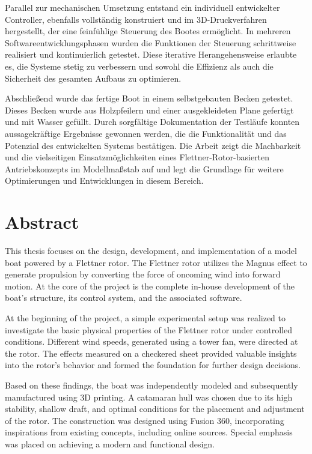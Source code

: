 \documentclass[a4paper,12pt]{article}
\begin{document}
Parallel zur mechanischen Umsetzung entstand ein individuell entwickelter Controller, ebenfalls vollständig konstruiert und im 3D-Druckverfahren hergestellt, der eine feinfühlige Steuerung des Bootes ermöglicht. In mehreren Softwareentwicklungsphasen wurden die Funktionen der Steuerung schrittweise realisiert und kontinuierlich getestet. Diese iterative Herangehensweise erlaubte es, die Systeme stetig zu verbessern und sowohl die Effizienz als auch die Sicherheit des gesamten Aufbaus zu optimieren.\newline

Abschließend wurde das fertige Boot in einem selbstgebauten Becken getestet. Dieses Becken wurde aus Holzpfeilern und einer ausgekleideten Plane gefertigt und mit Wasser gefüllt. Durch sorgfältige Dokumentation der Testläufe konnten aussagekräftige Ergebnisse gewonnen werden, die die Funktionalität und das Potenzial des entwickelten Systems bestätigen. Die Arbeit zeigt die Machbarkeit und die vielseitigen Einsatzmöglichkeiten eines Flettner-Rotor-basierten Antriebskonzepts im Modellmaßstab auf und legt die Grundlage für weitere Optimierungen und Entwicklungen in diesem Bereich.

\newpage

\section*{Abstract}
\label{sec:Abstract}
This thesis focuses on the design, development, and implementation of a model boat powered by a Flettner rotor. The Flettner rotor utilizes the Magnus effect to generate propulsion by converting the force of oncoming wind into forward motion. At the core of the project is the complete in-house development of the boat's structure, its control system, and the associated software.\newline

At the beginning of the project, a simple experimental setup was realized to investigate the basic physical properties of the Flettner rotor under controlled conditions. Different wind speeds, generated using a tower fan, were directed at the rotor. The effects measured on a checkered sheet provided valuable insights into the rotor's behavior and formed the foundation for further design decisions.\newline

Based on these findings, the boat was independently modeled and subsequently manufactured using 3D printing. A catamaran hull was chosen due to its high stability, shallow draft, and optimal conditions for the placement and adjustment of the rotor. The construction was designed using Fusion 360, incorporating inspirations from existing concepts, including online sources. Special emphasis was placed on achieving a modern and functional design.\newline
\end{document}
